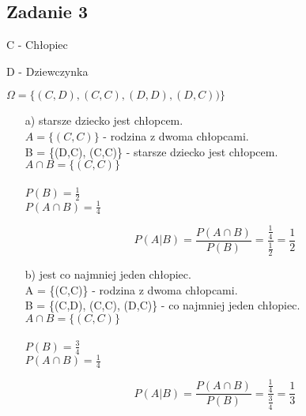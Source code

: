 \subsection{Zadanie 3}

C - Chłopiec

D - Dziewczynka

$\Omega = \{(C,D), (C,C), (D,D), (D,C))\}$


\begin{itemize}

\item[a)] starsze dziecko jest chłopcem.
\\$A = \{(C,C)\}$ - rodzina z dwoma chłopcami.
\\B = \{(D,C), (C,C)\} - starsze dziecko jest chłopcem.
\\$A \cap B = \{(C,C)\}$
\\
\\$P(B) = \frac{1}{2}$
\\$P(A \cap B) = \frac{1}{4}$

$$P(A | B) = \frac{P(A \cap B)}{P(B)} = \frac{\frac{1}{4}}{\frac{1}{2}} = \frac{1}{2}$$
\item[b)] jest co najmniej jeden chłopiec.
\\A = \{(C,C)\} - rodzina z dwoma chłopcami.
\\B = \{(C,D), (C,C), (D,C)\} - co najmniej jeden chłopiec.
\\$A \cap B = \{(C,C)\}$
\\
\\$P(B) = \frac{3}{4}$
\\$P(A \cap B) = \frac{1}{4}$

$$P(A | B) = \frac{P(A \cap B)}{P(B)} = \frac{\frac{1}{4}}{\frac{3}{4}} = \frac{1}{3}$$

\end{itemize}

